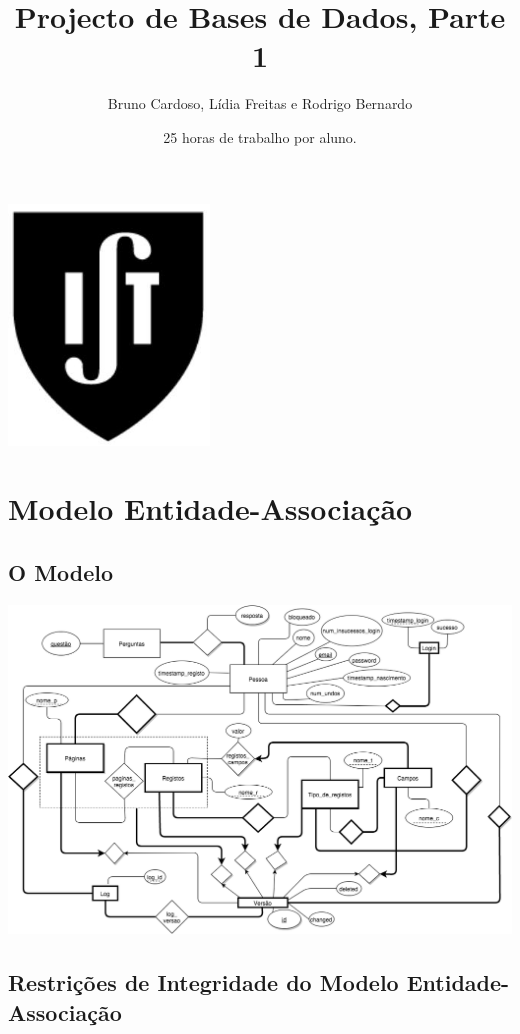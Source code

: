 \documentclass[11pt,a4paper]{article}
\title{\textbf{Projecto de Bases de Dados, Parte 1}}
\author{Bruno Cardoso, Lídia Freitas e Rodrigo Bernardo}
\affil{Instituto Superior T\'{e}cnico}
\begin{document}
\date{25 horas de trabalho por aluno.}

\maketitle

\centerline{\includegraphics[width=0.4\textwidth]{ist-simbolo.jpg}}
\newpage

\tableofcontents
\newpage

\section{Modelo Entidade-Associa\c{c}\~ao}
\subsection{O Modelo}

\centerline{\includegraphics[width=1.0\textwidth]{modelo-ea.png}}

\newpage

\subsection{Restri\c{c}\~oes de Integridade do Modelo Entidade-Associa\c{c}\~ao}
\end{document}
